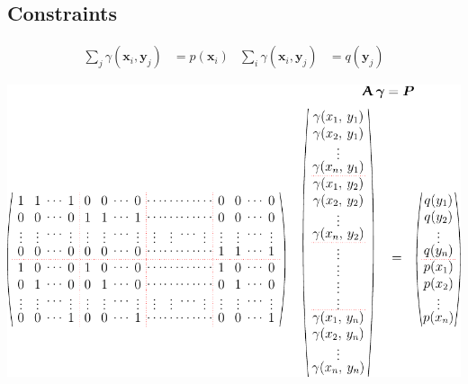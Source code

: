 
\begin{slide}
\section[-3]{Constraints}
  
\begin{PauseHighLight}
  {\small
\begin{align*}
  \sum_j \gamma(\bm{x}_i,\bm{y}_j) &= p(\bm{x}_i) &
 \sum_i \gamma(\bm{x}_i,\bm{y}_j) &= q(\bm{y}_j)
\end{align*}}
\begin{center}
  \includegraphics[width=0.8\linewidth]{Amat}\pause
\end{center}
\end{PauseHighLight}

\end{slide}


